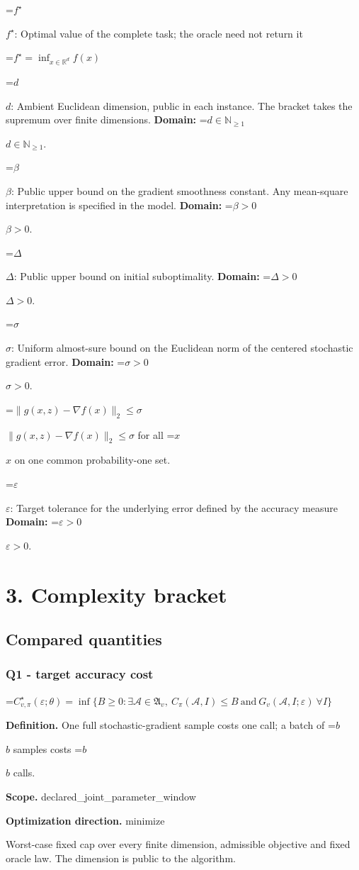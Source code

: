 \documentclass[10pt,a4paper]{article}
\newcommand{\AtlasMath}[1]{\par\begingroup\centering\setbox0=\hbox{$\displaystyle #1$}\ifdim\wd0>1.4\linewidth\typeout{ATLAS WIDE FORMULA: \the\wd0}\fi\ifdim\wd0>\linewidth\resizebox{\linewidth}{!}{\box0}\else\box0\fi\par\endgroup}
\newcommand{\AtlasInlineMath}[1]{\begingroup\setbox0=\hbox{$#1$}\ifdim\wd0>.4\linewidth\endgroup\AtlasMath{#1}\else\endgroup$#1$\fi}
\begin{document}
\AtlasInlineMath{f^\star}: Optimal value of the complete task; the oracle need not return it


\AtlasMath{f^\star=\inf_{x\in \mathbb{R}^d}f(x)}


\AtlasInlineMath{d}: Ambient Euclidean dimension, public in each instance. The bracket takes the supremum over finite dimensions. \textbf{Domain:} \AtlasInlineMath{d\in\mathbb{N}_{\ge1}}.

\AtlasInlineMath{\beta}: Public upper bound on the gradient smoothness constant. Any mean-square interpretation is specified in the model. \textbf{Domain:} \AtlasInlineMath{\beta>0}.

\AtlasInlineMath{\Delta}: Public upper bound on initial suboptimality. \textbf{Domain:} \AtlasInlineMath{\Delta>0}.

\AtlasInlineMath{\sigma}: Uniform almost-sure bound on the Euclidean norm of the centered stochastic gradient error. \textbf{Domain:} \AtlasInlineMath{\sigma>0}.

\AtlasInlineMath{\|g(x,z)-\nabla f(x)\|_2\le\sigma} for all \AtlasInlineMath{x} on one common probability-one set.

\AtlasInlineMath{\varepsilon}: Target tolerance for the underlying error defined by the accuracy measure \textbf{Domain:} \AtlasInlineMath{\varepsilon>0}.

\section{3. Complexity bracket}
\subsection{Compared quantities}
\subsubsection{Q1 - target accuracy cost}
\AtlasMath{C^\star_{v,\pi}(\varepsilon;\theta)=\inf\{B\ge0:\exists\mathcal A\in\mathfrak A_v,\ C_\pi(\mathcal A,I)\le B\ \text{and}\ G_v(\mathcal A,I;\varepsilon)\ \forall I\}}
\textbf{Definition.} One full stochastic-gradient sample costs one call; a batch of \AtlasInlineMath{b} samples costs \AtlasInlineMath{b} calls.

\textbf{Scope.} declared\_joint\_parameter\_window

\textbf{Optimization direction.} minimize

Worst-case fixed cap over every finite dimension, admissible objective and fixed oracle law. The dimension is public to the algorithm.
\end{document}
